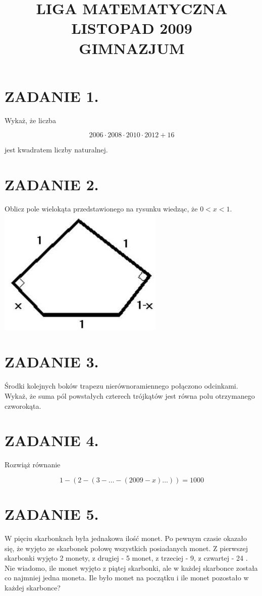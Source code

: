 \documentclass[10pt]{article}
\title{LIGA MATEMATYCZNA \\
 LISTOPAD 2009 \\
 GIMNAZJUM }
\author{}
\date{}
\begin{document}
\maketitle
\section*{ZADANIE 1.}
Wykaż, że liczba

\[
2006 \cdot 2008 \cdot 2010 \cdot 2012+16
\]

jest kwadratem liczby naturalnej.

\section*{ZADANIE 2.}
Oblicz pole wielokąta przedstawionego na rysunku wiedząc, że \(0<x<1\).\\
\includegraphics[max width=\textwidth, center]{2024_11_21_08f6750e4347117ff4bbg-1}

\section*{ZADANIE 3.}
Środki kolejnych boków trapezu nierównoramiennego połączono odcinkami. Wykaż, że suma pól powstałych czterech trójkątów jest równa polu otrzymanego czworokąta.

\section*{ZADANIE 4.}
Rozwiąż równanie

\[
1-(2-(3-\ldots-(2009-x) \ldots))=1000
\]

\section*{ZADANIE 5.}
W pięciu skarbonkach była jednakowa ilość monet. Po pewnym czasie okazało się, że wyjęto ze skarbonek połowę wszystkich posiadanych monet. Z pierwszej skarbonki wyjęto 2 monety, z drugiej - 5 monet, z trzeciej - 9, z czwartej - 24 . Nie wiadomo, ile monet wyjęto z piątej skarbonki, ale w każdej skarbonce została co najmniej jedna moneta. Ile było monet na początku i ile monet pozostało w każdej skarbonce?
\end{document}
